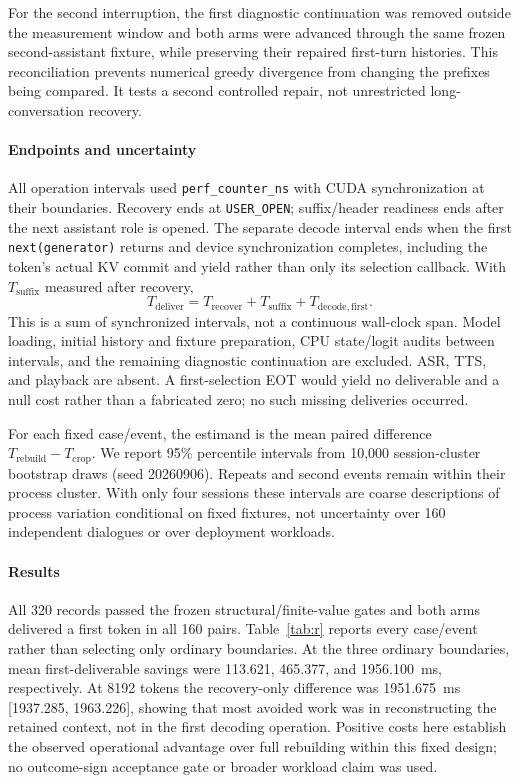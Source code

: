 For the second interruption, the first diagnostic continuation was removed outside the measurement window and both arms were advanced through the same frozen second-assistant fixture, while preserving their repaired first-turn histories. This reconciliation prevents numerical greedy divergence from changing the prefixes being compared. It tests a second controlled repair, not unrestricted long-conversation recovery.

\paragraph{Endpoints and uncertainty}
All operation intervals used \texttt{perf\_counter\_ns} with CUDA synchronization at their boundaries. Recovery ends at \texttt{USER\_OPEN}; suffix/header readiness ends after the next assistant role is opened. The separate decode interval ends when the first \texttt{next(generator)} returns and device synchronization completes, including the token's actual KV commit and yield rather than only its selection callback. With $T_{\mathrm{suffix}}$ measured after recovery,
\begin{equation}
T_{\mathrm{deliver}}=T_{\mathrm{recover}}+T_{\mathrm{suffix}}+T_{\mathrm{decode,first}}.
\label{eq:recovery-cost}
\end{equation}
This is a sum of synchronized intervals, not a continuous wall-clock span. Model loading, initial history and fixture preparation, CPU state/logit audits between intervals, and the remaining diagnostic continuation are excluded. ASR, TTS, and playback are absent. A first-selection EOT would yield no deliverable and a null cost rather than a fabricated zero; no such missing deliveries occurred.

For each fixed case/event, the estimand is the mean paired difference $T_{\mathrm{rebuild}}-T_{\mathrm{crop}}$. We report 95\% percentile intervals from 10,000 session-cluster bootstrap draws (seed 20260906). Repeats and second events remain within their process cluster. With only four sessions these intervals are coarse descriptions of process variation conditional on fixed fixtures, not uncertainty over 160 independent dialogues or over deployment workloads.

\paragraph{Results}
All 320 records passed the frozen structural/finite-value gates and both arms delivered a first token in all 160 pairs. Table~\ref{tab:r} reports every case/event rather than selecting only ordinary boundaries. At the three ordinary boundaries, mean first-deliverable savings were 113.621, 465.377, and 1956.100~ms, respectively. At 8192 tokens the recovery-only difference was 1951.675~ms [1937.285, 1963.226], showing that most avoided work was in reconstructing the retained context, not in the first decoding operation. Positive costs here establish the observed operational advantage over full rebuilding within this fixed design; no outcome-sign acceptance gate or broader workload claim was used.

